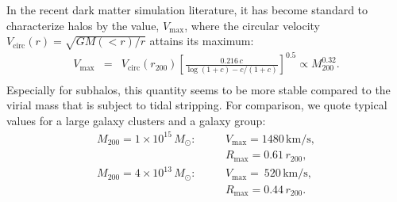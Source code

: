 \documentclass[10pt,aps,pra,reprint,amsmath,amsfonts,amssymb,showpacs,nofootinbib,floatfix]{revtex4-1}
\newcommand{\rmn}{\mathrm}
\newcommand{\msun}{M_\odot}
\newcommand{\rvir}{r_{200}}
\newcommand{\mvir}{M_{200}}
\begin{document}
In the recent dark matter simulation literature, it has become
standard to characterize halos by the value, $V_\rmn{max}$, where the
circular velocity $V_\rmn{circ}(r)=\sqrt{GM(<r)/r}$ attains its
maximum:
\begin{eqnarray}
V_\rmn{max} &=& V_\rmn{circ}(\rvir) 
\left[\frac{0.216\,c}{\log(1+c)-c/(1+c)}\right]^{0.5}\propto \mvir^{0.32}.\nonumber\\
\end{eqnarray}
Especially for subhalos, this quantity seems to be more stable
compared to the virial mass that is subject to tidal stripping. For
comparison, we quote typical values for a large galaxy clusters and a galaxy group:
\begin{eqnarray}
M_{200} = 1\times10^{15}\,\msun:\quad &&V_\rmn{max}=1480\,\rmn{km/s}, \nonumber\\
                                     &&R_\rmn{max}=0.61\,\rvir, \\
M_{200} = 4\times10^{13}\,\msun:\quad &&V_\rmn{max}=~520\,\rmn{km/s}, \nonumber\\
                                     &&R_\rmn{max}=0.44\,\rvir.
\end{eqnarray}
\end{document}
